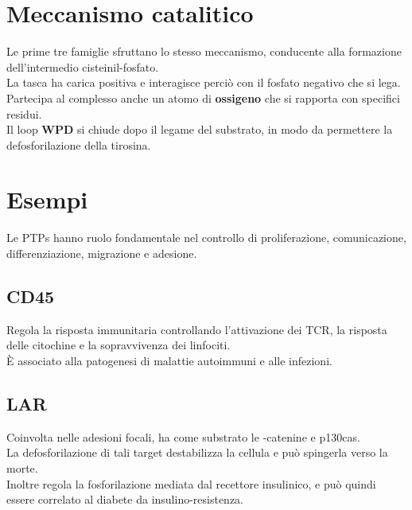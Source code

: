 \documentclass[a4paper, 12pt]{article}
\begin{document}
\section{Meccanismo catalitico}
Le prime tre famiglie sfruttano lo stesso meccanismo, conducente alla formazione dell'intermedio cisteinil-fosfato.\\
La tasca ha carica positiva e interagisce perciò con il fosfato negativo che si lega. Partecipa al complesso anche un atomo di \textbf{ossigeno} che si rapporta con specifici residui.\\
Il loop \textbf{WPD} si chiude dopo il legame del substrato, in modo da permettere la defosforilazione della tirosina.

\section{Esempi}
Le PTPs hanno ruolo fondamentale nel controllo di proliferazione, comunicazione, differenziazione, migrazione e adesione.

\subsection{CD45}
Regola la risposta immunitaria controllando l'attivazione dei TCR, la risposta delle citochine e la sopravvivenza dei linfociti.\\
È associato alla patogenesi di malattie autoimmuni e alle infezioni.

\subsection{LAR}
Coinvolta nelle adesioni focali, ha come substrato le \textbeta-catenine e p130cas.\\
La defosforilazione di tali target destabilizza la cellula e può spingerla verso la morte.\\
Inoltre regola la fosforilazione mediata dal recettore insulinico, e può quindi essere correlato al diabete da insulino-resistenza.
\end{document}
